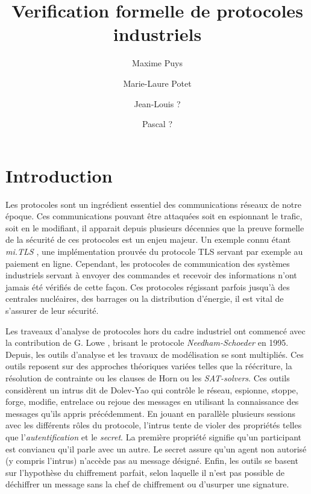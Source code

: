 \documentclass{article}
\title{Verification formelle de protocoles industriels}
\author[1]{Maxime Puys}
\author[1]{Marie-Laure Potet}
\author[2]{Jean-Louis ?}
\author[3]{Pascal ?}
\affil[1]{
    Univ. Grenoble Alpes, VERIMAG, F-38000 Grenoble, France\\
    CNRS, VERIMAG, F-38000 Grenoble, France
}
\date{}
\begin{document}
\maketitle


\section{Introduction}

Les protocoles sont un ingrédient essentiel des communications réseaux de notre époque.
Ces communications pouvant être attaquées soit en espionnant le trafic, soit en le modifiant,
il apparait depuis plusieurs décennies que la preuve formelle de la sécurité de ces protocoles
est un enjeu majeur.
Un exemple connu étant {\em mi.TLS} \cite{BFKPS13}, une implémentation prouvée du protocole TLS \cite{DR08}
servant par exemple au paiement en ligne.
Cependant, les protocoles de communication des systèmes industriels servant à envoyer des commandes
et recevoir des informations n'ont jamais été vérifiés de cette façon.
Ces protocoles régissant parfois jusqu'à des centrales nucléaires, des barrages ou la distribution d'énergie,
il est vital de s'assurer de leur sécurité.

Les traveaux d'analyse de protocoles hors du cadre industriel ont commencé avec la contribution de
G. Lowe \cite{Low96}, brisant le protocole {\em Needham-Schoeder} en 1995.
Depuis, les outils d'analyse et les travaux de modélisation se sont multipliés.
Ces outils reposent sur des approches théoriques variées telles que la réécriture,
la résolution de contrainte ou les clauses de Horn ou les {\em SAT-solvers}.
Ces outils considèrent un intrus dit de Dolev-Yao \cite{DY81} qui contrôle le réseau,
espionne, stoppe, forge, modifie, entrelace ou rejoue des messages en utilisant la connaissance
des messages qu'ils appris précédemment.
En jouant en parallèle plusieurs sessions avec les différents rôles du protocole,
l'intrus tente de violer des propriétés telles que l'{\em autentification} et le {\em secret}.
La première propriété signifie qu'un participant est conviancu qu'il parle avec un autre.
Le secret assure qu'un agent non autorisé (y compris l'intrus) n'accède pas au message désigné.
Enfin, les outils se basent sur l'hypothèse du chiffrement parfait, selon laquelle
il n'est pas possible de déchiffrer un message sans la chef de chiffrement ou d'usurper une signature.
\end{document}

